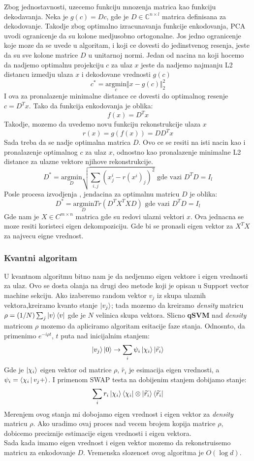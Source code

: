 \documentclass[12pt, letterpaper, oneside]{article}
\begin{document}
Zbog jednostavnosti, uzecemo funkciju mnozenja matrica kao funkciju dekodavanja. Neka je $g(c)=Dc$, gde je
$D \in \mathbb{C}^{n \times l}$ matrica definisana za dekodovanje. Takodje zbog optimalno izracunavanja funkcije enkodovanja, 
PCA uvodi ogranicenje da su kolone medjusobno ortogonalne. Jos jedno ogranicenje koje moze da se uvede u algoritam,
i koji ce dovesti do jedinstvenog resenja, jeste da su sve kolone matrice $D$ u unitarnoj normi.
Jedan od nacina na koji hocemo da nadjemo optimalnu projekciju $c$ za ulaz $x$ jeste da nadjemo najmanju L2 distancu izmedju
ulaza $x$ i dekodovane vrednosti $g(c)$
\[
  c^{*} = \underset{c}{\mathrm{argmin}} \Vert x-g(c) \Vert_2^2
\]
I ova za pronalazenje minimalne distance ce dovesti do optimalnog resenje $c=D^{T}x$\cite{goodfellow2016deep}. Tako da funkcija enkodovanja je oblika:
\[
f(x) = D^Tx  
\]
Takodje, mozemo da uvedemo novu funkciju rekonstrukcije ulaza $x$
\[
  r(x) = g(f(x)) = DD^Tx  
\]
Sada treba da se nadje optimalna matrica $D$. Ovo ce se resiti na isti nacin kao i pronalazenje optimalnog $c$ za ulaz $x$, odnostno kao pronalazenje minimalne L2 distance za ulazne vektore
njihove rekonstrukcije.
\[
    D^{*} =\underset{D}{\mathrm{argmin}} \sqrt{\sum_{i,j}(x^i_j - r(x^i)_j)^2} \text{ gde vazi } D^TD = I_l
\]
Posle procesa izvodjenja \cite{goodfellow2016deep}, jendacina za optimalnu matricu $D$ je oblika:
\[
    D^{*} =\underset{D}{\mathrm{argmin}}  Tr(D^TX^TXD) \text{ gde vazi } D^TD = I_l
\] 
Gde nam je $X \in C^{m \times n}$ matrica gde su redovi ulazni vektori $x$. Ova jednacna se moze resiti koristeci eigen dekompoziciju. Gde bi 
se pronasli eigen vektor za $X^TX$ za najvecu eigne vrednost. 
\subsubsection{Kvantni algoritam}
U kvantnom algoritmu bitno nam je da nedjenmo eigen vektore i eigen vrednosti za ulaz. Ovo se dosta olanja na drugi deo metode koji je opisan u Support vector machine sekciju.
Ako izaberemo random vektor $v_j$ iz skupa ulaznih vektora,kreiramo kvanto stanje $\Ket{v_j}$; tada mozemo da kreiramo \textit{density} matricu $\rho = (1/N)\sum_j\Ket{v}\Bra{v}$ gde je $N$ velinica skupa vektora. \cite{Quantum_machine_learning}
Slicno \textbf{qSVM} nad \textit{density} matricom $\rho$ mozemo da apliciramo algoritam esitacije faze stanja. Odnosnto, da primenimo $e^{-i \rho t}$, $t$ puta nad inicijalnim stanjem:
\[
    \Ket{v_j}\Ket{0} \to \sum_i \psi_i\Ket{\chi_i}\Ket{\widetilde{r_i}}
\] 
Gde je $\Ket{\chi_i}$ eigen vektor od matrice $\rho$, $\widetilde{r_i}$ je esimacija eigen vrednosti, a $\psi_i = \Braket{\chi_i|v_j+}$.
I primenom SWAP testa na dobijenim stanjem dobijamo stanje:
\[
    \sum_i r_i \Ket{\chi_i}\Bra{\chi_i}\otimes \Ket{\widetilde{r_i}}\Bra{\widetilde{r_i}}
\]
Merenjem ovog stanja mi dobojamo eigen vrednost i eigen vektor za \textit{density} matricu $\rho$. Ako uradimo 
ovaj proces nad vecem brojem kopija matrice $\rho$, dobicemo preciznije estimacije eigen vrednosti i eigen vektora. \\
Sada kada imamo eigen vrednost i eigen vektor mozemo da rekonstruisemo matricu za enkodovanje $D$.
Vremenska slozenost ovog algoritma je $O(\log d)$. \cite{Lloyd_2014}
\end{document}

